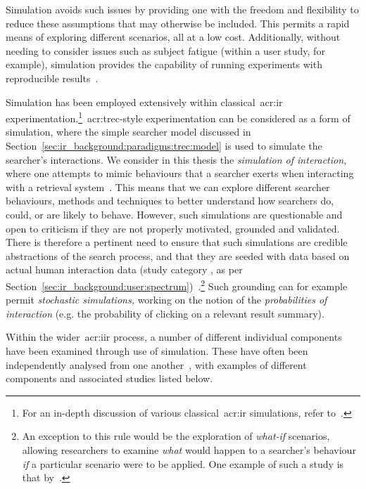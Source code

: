 Simulation avoids such issues by providing one with the freedom and flexibility to reduce these assumptions that may otherwise be included. This permits a rapid means of exploring different scenarios, all at a low cost. Additionally, without needing to consider issues such as subject fatigue (within a user study, for example), simulation provides the capability of running experiments with reproducible results~\citep{azzopardi2010workshop}. 

Simulation has been employed extensively within classical~\gls{acr:ir} experimentation.\footnote{For an in-depth discussion of various classical~\gls{acr:ir} simulations, refer to~\cite{heine1981simulation}.}~\gls{acr:trec}-style experimentation can be considered as a form of simulation, where the simple searcher model discussed in Section~\ref{sec:ir_background:paradigms:trec:model} is used to simulate the searcher's interactions. We consider in this thesis the \emph{simulation of interaction,} where one attempts to mimic behaviours that a searcher exerts when interacting with a retrieval system~\citep{azzopardi2010workshop}. This means that we can explore different searcher behaviours, methods and techniques to better understand how searchers do, could, or are likely to behave. However, such simulations are questionable and open to criticism if they are not properly motivated, grounded and validated. There is therefore a pertinent need to ensure that such simulations are credible abstractions of the search process, and that they are seeded with data based on actual human interaction data (study category , as per Section~\ref{sec:ir_background:user:spectrum})~\citep{azzopardi2010workshop}.\footnote{An exception to this rule would be the exploration of \emph{what-if} scenarios, allowing researchers to examine \emph{what} would happen to a searcher's behaviour \emph{if} a particular scenario were to be applied. One example of such a study is that by~\cite{azzopardi2011economics}.} Such grounding can for example permit \emph{stochastic simulations,} working on the notion of the \emph{probabilities of interaction} (e.g. the probability of clicking on a relevant result summary).

Within the wider~\gls{acr:iir} process, a number of different individual components have been examined through use of simulation. These have often been independently analysed from one another~\citep{azzopardi2010workshop}, with examples of different components and associated studies listed below.

